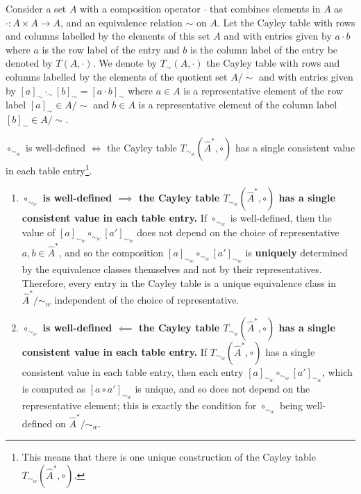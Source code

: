 Consider a set $A$ with a composition operator $\cdot$ that combines elements in $A$ as $\cdot: A \times A \to A$, and an equivalence relation $\sim$ on $A$.
Let the Cayley table with rows and columns labelled by the elements of this set $A$ and with entries given by $a \cdot b$ where $a$ is the row label of the entry and $b$ is the column label of the entry be denoted by $T(A, \cdot)$.
We denote by $T_{\sim}(A, \cdot)$ the Cayley table with rows and columns labelled by the elements of the quotient set $A/\sim$ and with entries given by $[a]_{\sim} \cdot_{\sim} [b]_{\sim} = [a \cdot b]_{\sim}$ where $a \in A$ is a representative element of the row label $[a]_{\sim} \in A/\sim$ and $b \in A$ is a representative element of the column label $[b]_{\sim} \in A/\sim$.


\begin{propositionE}\label{prp:local_sim_well_defined_means_single_unique_Cayley_table}
    $\circ_{\sim_{w}}$ is well-defined $\iff$ the Cayley table $T_{\sim_{w}}(\hat{A}^{*}, \circ)$ has a single consistent value in each table entry\footnote{
    This means that there is one unique construction of the Cayley table $T_{\sim_{w}}(\hat{A}^{*}, \circ)$.
    }.
\end{propositionE}
\begin{proofE}
\begin{enumerate}
    \item \textbf{$\circ_{\sim_{w}}$ is well-defined $\implies$ the Cayley table $T_{\sim_{w}}(\hat{A}^{*}, \circ)$ has a single consistent value in each table entry.}
    If $\circ_{\sim_{w}}$ is well-defined, then the value of $[a]_{\sim_{w}} \circ_{\sim_{w}} [a']_{\sim_{w}}$ does not depend on the choice of representative $a, b \in \hat{A}^{*}$, and so the composition $[a]_{\sim_{w}} \circ_{\sim_{w}} [a']_{\sim_{w}}$ is \textbf{uniquely} determined by the equivalence classes themselves and not by their representatives.
    Therefore, every entry in the Cayley table is a unique equivalence class in $\hat{A}^{*}/\sim_{w}$ independent of the choice of representative.

    \item \textbf{$\circ_{\sim_{w}}$ is well-defined $\impliedby$ the Cayley table $T_{\sim_{w}}(\hat{A}^{*}, \circ)$ has a single consistent value in each table entry.}
    If $T_{\sim_{w}}(\hat{A}^{*}, \circ)$ has a single consistent value in each table entry, then each entry $[a]_{\sim_{w}} \circ_{\sim_{w}} [a']_{\sim_{w}}$, which is computed as $[a \circ a']_{\sim_{w}}$ is unique, and so does not depend on the representative element; this is exactly the condition for $\circ_{\sim_{w}}$ being well-defined on $\hat{A}^{*}/\sim_{w}$.
\end{enumerate}
\end{proofE}

